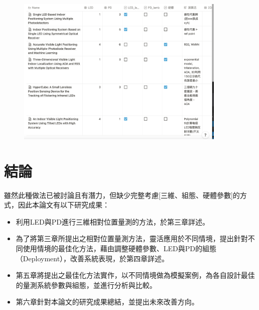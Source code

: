        \begin{figure}[ht]
            \centering
            \includegraphics[width=10cm]{00temppic/temp.png}
        \end{figure}



\section{結論}

雖然此種做法已被討論且有潛力，但缺少完整考慮[三維、組態、硬體參數]的方式，因此本論文有以下研究成果：
\begin{itemize}
    \item 利用LED與PD進行三維相對位置量測的方法，於第三章詳述。
    \item 為了將第三章所提出之相對位置量測方法，靈活應用於不同情境，提出針對不同使用情境的最佳化方法，藉由調整硬體參數、LED與PD的組態（Deployment），改善系統表現，於第四章詳述。
    \item 第五章將提出之最佳化方法實作，以不同情境做為模擬案例，為各自設計最佳的量測系統參數與組態，並進行分析與比較。
    \item 第六章針對本論文的研究成果總結，並提出未來改善方向。
\end{itemize}